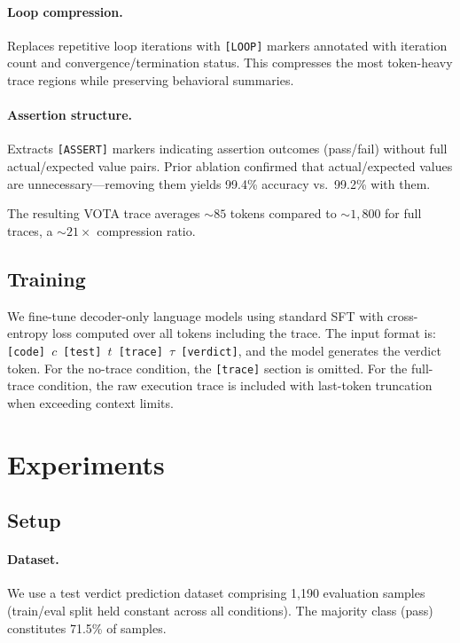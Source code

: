 \documentclass[11pt]{article}
\newcommand{\vota}{\textsc{VOTA}}
\begin{document}
\paragraph{Loop compression.} Replaces repetitive loop iterations with \texttt{[LOOP]} markers annotated with iteration count and convergence/termination status. This compresses the most token-heavy trace regions while preserving behavioral summaries.

\paragraph{Assertion structure.} Extracts \texttt{[ASSERT]} markers indicating assertion outcomes (pass/fail) without full actual/expected value pairs. Prior ablation confirmed that actual/expected values are unnecessary---removing them yields 99.4\% accuracy vs.\ 99.2\% with them.

The resulting \vota{} trace averages ${\sim}85$ tokens compared to ${\sim}1{,}800$ for full traces, a ${\sim}21{\times}$ compression ratio.

\subsection{Training}

We fine-tune decoder-only language models using standard SFT with cross-entropy loss computed over all tokens including the trace. The input format is: \texttt{[code] $c$ [test] $t$ [trace] $\tau$ [verdict]}, and the model generates the verdict token. For the no-trace condition, the \texttt{[trace]} section is omitted. For the full-trace condition, the raw execution trace is included with last-token truncation when exceeding context limits.

\section{Experiments}

\subsection{Setup}

\paragraph{Dataset.} We use a test verdict prediction dataset comprising 1,190 evaluation samples (train/eval split held constant across all conditions). The majority class (pass) constitutes 71.5\% of samples.
\end{document}
